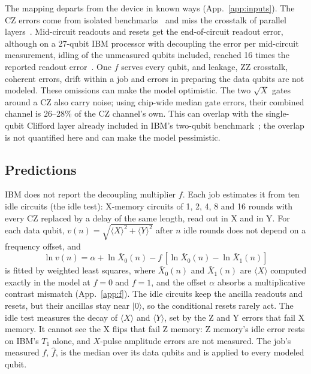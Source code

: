 \documentclass[aps,pra,reprint,nofootinbib,longbibliography,floatfix,showkeys]{revtex4-2}
\newcommand{\ket}[1]{\lvert #1\rangle}
\newcommand{\fhat}{\hat f}
\begin{document}
The mapping departs from the device in known ways (App.~\ref{app:inputs}).
The CZ errors come from isolated benchmarks~\cite{ibmdocs} and miss the crosstalk of parallel layers~\cite{mckay2023benchmarking}.
Mid-circuit readouts and resets get the end-of-circuit readout error, although on a 27-qubit IBM processor with decoupling the error per mid-circuit measurement, idling of the unmeasured qubits included, reached 16 times the reported readout error~\cite{hothem2025measuring}.
One $f$ serves every qubit, and leakage, ZZ crosstalk, coherent errors, drift within a job and errors in preparing the data qubits are not modeled.
These omissions can make the model optimistic.
The two $\sqrt{X}$ gates around a CZ also carry noise; using chip-wide median gate errors, their combined channel is 26--28\% of the CZ channel's own.
This can overlap with the single-qubit Clifford layer already included in IBM's two-qubit benchmark~\cite{ibmdocs}; the overlap is not quantified here and can make the model pessimistic.

\subsection{Predictions}
\label{sec:pred}

IBM does not report the decoupling multiplier $f$.
Each job estimates it from ten idle circuits (the idle test): X-memory circuits of 1, 2, 4, 8 and 16 rounds with every CZ replaced by a delay of the same length, read out in X and in Y.
For each data qubit, $v(n) = \sqrt{\langle X\rangle^2 + \langle Y\rangle^2}$ after $n$ idle rounds does not depend on a frequency offset, and
\begin{equation}
  \ln v(n) = \alpha + \ln \bar X_0(n) - f\,[\ln \bar X_0(n) - \ln \bar X_1(n)]
  \label{eq:ffit}
\end{equation}
is fitted by weighted least squares, where $\bar X_0(n)$ and $\bar X_1(n)$ are $\langle X\rangle$ computed exactly in the model at $f=0$ and $f=1$, and the offset $\alpha$ absorbs a multiplicative contrast mismatch (App.~\ref{app:f}).
The idle circuits keep the ancilla readouts and resets, but their ancillas stay near $\ket{0}$, so the conditional resets rarely act.
The idle test measures the decay of $\langle X\rangle$ and $\langle Y\rangle$, set by the Z and Y errors that fail X memory.
It cannot see the X flips that fail Z memory: Z memory's idle error rests on IBM's $T_1$ alone, and $X$-pulse amplitude errors are not measured.
The job's measured $f$, $\fhat$, is the median over its data qubits and is applied to every modeled qubit.
\end{document}
